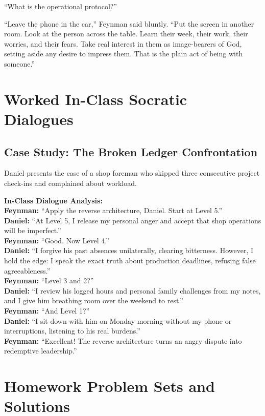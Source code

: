 \documentclass[11pt]{report}
\begin{document}
``What is the operational protocol?''

``Leave the phone in the car,'' Feynman said bluntly. ``Put the screen in another room. Look at the person across the table. Learn their week, their work, their worries, and their fears. Take real interest in them as image-bearers of God, setting aside any desire to impress them. That is the plain act of being with someone.''

\chapter{Worked In-Class Socratic Dialogues}

\section{Case Study: The Broken Ledger Confrontation}
Daniel presents the case of a shop foreman who skipped three consecutive project check-ins and complained about workload.

\begin{blackboard}
\textbf{In-Class Dialogue Analysis:}\\
\textbf{Feynman:} ``Apply the reverse architecture, Daniel. Start at Level 5.''\\
\textbf{Daniel:} ``At Level 5, I release my personal anger and accept that shop operations will be imperfect.''\\
\textbf{Feynman:} ``Good. Now Level 4.''\\
\textbf{Daniel:} ``I forgive his past absences unilaterally, clearing bitterness. However, I hold the edge: I speak the exact truth about production deadlines, refusing false agreeableness.''\\
\textbf{Feynman:} ``Level 3 and 2?''\\
\textbf{Daniel:} ``I review his logged hours and personal family challenges from my notes, and I give him breathing room over the weekend to rest.''\\
\textbf{Feynman:} ``And Level 1?''\\
\textbf{Daniel:} ``I sit down with him on Monday morning without my phone or interruptions, listening to his real burdens.''\\
\textbf{Feynman:} ``Excellent! The reverse architecture turns an angry dispute into redemptive leadership.''
\end{blackboard}

\chapter{Homework Problem Sets and Solutions}
\end{document}
